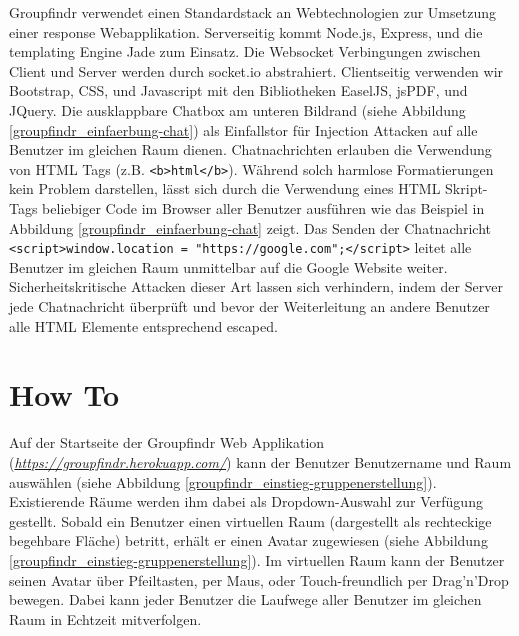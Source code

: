 Groupfindr verwendet einen Standardstack an Webtechnologien zur Umsetzung einer response Webapplikation. Serverseitig kommt Node.js, Express, und die templating Engine Jade zum Einsatz. Die Websocket Verbingungen zwischen Client und Server werden durch socket.io abstrahiert. Clientseitig verwenden wir Bootstrap, CSS, und Javascript mit den Bibliotheken EaselJS, jsPDF, und JQuery.
\newline\newline
Die ausklappbare Chatbox am unteren Bildrand (siehe Abbildung \ref{groupfindr_einfaerbung-chat}) als Einfallstor für Injection Attacken auf alle Benutzer im gleichen Raum dienen. Chatnachrichten erlauben die Verwendung von HTML Tags (z.B. \verb|<b>html</b>|). Während solch harmlose Formatierungen kein Problem darstellen, lässt sich durch die Verwendung eines HTML Skript-Tags beliebiger Code im Browser aller Benutzer ausführen wie das Beispiel in Abbildung \ref{groupfindr_einfaerbung-chat} zeigt. 
\newline
Das Senden der Chatnachricht \verb|<script>window.location = "https://google.com";</script>| leitet alle Benutzer im gleichen Raum unmittelbar auf die Google Website weiter. Sicherheitskritische Attacken dieser Art lassen sich verhindern, indem der Server jede Chatnachricht überprüft und bevor der Weiterleitung an andere Benutzer alle HTML Elemente entsprechend escaped.

\section{How To}
\label{how_to}

Auf der Startseite der Groupfindr Web Applikation (\textit{\href{https://groupfindr.herokuapp.com/}{https://groupfindr.herokuapp.com/}}) kann der Benutzer Benutzername und Raum auswählen (siehe Abbildung \ref{groupfindr_einstieg-gruppenerstellung}). Existierende Räume werden ihm dabei als Dropdown-Auswahl zur Verfügung gestellt. Sobald ein Benutzer einen virtuellen Raum (dargestellt als rechteckige begehbare Fläche) betritt, erhält er einen Avatar zugewiesen (siehe Abbildung \ref{groupfindr_einstieg-gruppenerstellung}). Im virtuellen Raum kann der Benutzer seinen Avatar über Pfeiltasten, per Maus, oder Touch-freundlich per Drag’n’Drop bewegen. Dabei kann jeder Benutzer die Laufwege aller Benutzer im gleichen Raum in Echtzeit mitverfolgen.

